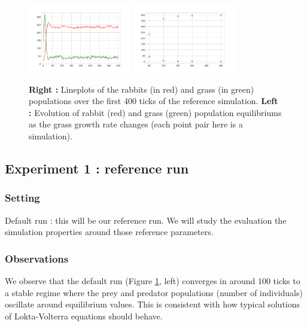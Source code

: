 \documentclass[11pt]{article}
\begin{document}
\begin{figure}[h!]
    \centering
    \includegraphics[width=0.4\textwidth]{plots/sim1.png}
    \includegraphics[width=0.4\textwidth]{plots/ggrate.png}
    \caption{\textbf{Right :} Lineplots of the rabbits (in red) and grass (in green) populations over the first 400 ticks of the reference simulation. \textbf{Left :} Evolution of rabbit (red) and grass (green) population equilibriums as the grass growth rate changes (each point pair here is a simulation).}
    \label{figure}
  \end{figure}

\subsection{Experiment 1 : reference run}

\subsubsection{Setting}

Default run : this will be our reference run. We will study the evaluation the simulation properties around those reference parameters.

\subsubsection{Observations} 

We observe that the default run (Figure \ref{figure}, left) converges in around $100$ ticks to a stable regime where the prey and predator populations (number of individuals) oscillate around equilibrium values. This is consistent with how typical solutions of Lokta-Volterra equations should behave.
\end{document}
